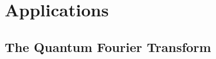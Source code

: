 \documentclass{article}
\theoremstyle{definition}
\theoremstyle{theorem}
\theoremstyle{remark}
\begin{document}
%
%

\section{Applications}

\subsection{The Quantum Fourier Transform}
\end{document}
